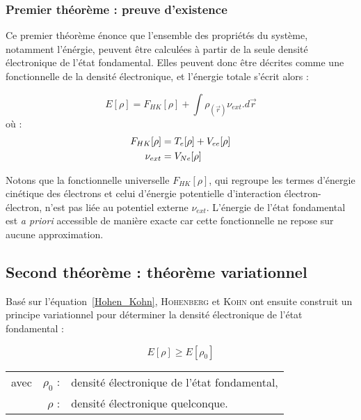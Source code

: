 	\subsubsection{Premier théorème : preuve d'existence}
	
	Ce premier théorème énonce que l'ensemble des propriétés du système, notamment l'énérgie, peuvent être calculées à partir de la seule densité électronique de l'état fondamental. Elles peuvent donc être décrites comme une fonctionnelle de la densité électronique, et l'énergie totale s'écrit alors :
	
	\begin{equation}
	E[\rho] = F_{HK}[\rho] + \int \rho_{(\vec{r})} \nu_{ext} .d\vec{r}
	\label{Hohen_Kohn}
	\end{equation}
	\noindent où :
	\begin{align}
	F_{HK}[\rho] &= T_{e}[\rho] + V_{ee}[\rho] \\
	\nu_{ext} &= V_{Ne}[\rho] \notag
	\end{align}
	
	Notons que la fonctionnelle universelle $F_{HK}[\rho]$, qui regroupe les termes d'énergie cinétique des électrons et celui d'énergie potentielle d'interaction électron-électron, n'est pas liée au potentiel externe $\nu_{ext}$. L'énergie de l'état fondamental est \textit{a priori} accessible de manière exacte car cette fonctionnelle ne repose sur aucune approximation.
	
	\subsection{Second théorème : théorème variationnel}
	
	Basé sur l'équation~\ref{Hohen_Kohn}, \textsc{Hohenberg} et \textsc{Kohn} ont ensuite construit un principe variationnel pour déterminer la densité électronique de l'état fondamental :
	
	\begin{equation}
	E[\rho] \geq E[\rho_{0}]
	\end{equation}
	
	\begin{flushleft}
		\begin{tabular}{@{}lrp{10cm}}
			avec & $\rho_{0}$ : & densité électronique de l'état fondamental, \\
			& $\rho$ : & densité électronique quelconque.
		\end{tabular}
	\end{flushleft}
	
